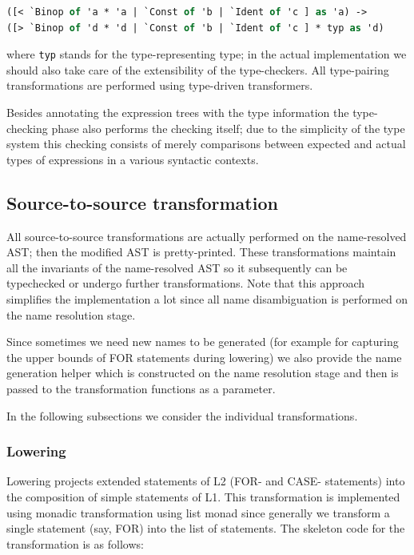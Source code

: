 \begin{lstlisting}[language=ocaml]
([< `Binop of 'a * 'a | `Const of 'b | `Ident of 'c ] as 'a) ->
([> `Binop of 'd * 'd | `Const of 'b | `Ident of 'c ] * typ as 'd)
\end{lstlisting}

where \lstinline{typ} stands for the type-representing type; in the actual implementation
we should also take care of the extensibility of the type-checkers. All type-pairing
transformations are performed using type-driven transformers.

Besides annotating the expression trees with the type information the type-checking 
phase also performs the checking itself; due to the simplicity of the type system
this checking consists of merely comparisons between expected and actual types of expressions
in a various syntactic contexts.

\subsection{Source-to-source transformation}

All source-to-source transformations are actually performed on the name-resolved AST; then
the modified AST is pretty-printed. These transformations maintain all the invariants of
the name-resolved AST so it subsequently can be typechecked or undergo further 
transformations. Note that this approach simplifies the implementation a lot since all name 
disambiguation is performed on the name resolution stage.

Since sometimes we need new names to be generated (for example for capturing the upper bounds of
FOR statements during lowering) we also provide the name generation helper which is constructed
on the name resolution stage and then is passed to the transformation functions as a parameter.

In the following subsections we consider the individual transformations.

\subsubsection{Lowering}

Lowering projects extended statements of L2 (FOR- and CASE- statements) into the composition
of simple statements of L1. This transformation is implemented using monadic transformation
using list monad since generally we transform a single statement (say, FOR) into the list
of statements. The skeleton code for the transformation is as follows:

